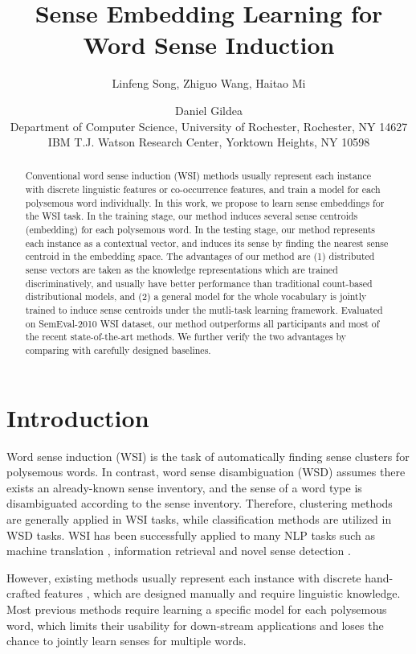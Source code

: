 \documentclass[11pt]{article}
\title{Sense Embedding Learning for Word Sense Induction}
\author{Linfeng Song, Zhiguo Wang, Haitao Mi \and Daniel Gildea \\
  Department of Computer Science, University of Rochester, Rochester, NY 14627 \\
  IBM T.J. Watson Research Center, Yorktown Heights, NY 10598  \\
  }
\date{}
\begin{document}
\maketitle

\begin{abstract}
Conventional word sense induction (WSI) methods usually represent each instance with discrete linguistic features or co-occurrence features, and train a model for each polysemous word individually. 
In this work, we propose to learn sense embeddings for the WSI task. 
In the training stage, our method induces several sense centroids (embedding) for each polysemous word. 
In the testing stage, our method represents each instance as a contextual vector, and induces its sense by finding the nearest sense centroid in the embedding space. 
The advantages of our method are 
(1) distributed sense vectors are taken as the knowledge representations which are trained discriminatively, and usually have better performance than traditional count-based distributional models,
and (2) a general model for the whole vocabulary is jointly trained to induce sense centroids under the mutli-task learning framework. 
Evaluated on SemEval-2010 WSI dataset, our method outperforms all participants and most of the recent state-of-the-art methods.
We further verify the two advantages by comparing with carefully designed baselines.
\end{abstract}


\section{Introduction}

Word sense induction (WSI) is the task of automatically finding sense clusters for polysemous words. In contrast, 
word sense disambiguation (WSD) assumes there exists an already-known sense inventory, 
and the sense of a word type is disambiguated according to the sense inventory.
Therefore, clustering methods are generally applied in WSI tasks, while classification methods are utilized in WSD tasks.
WSI has been successfully applied to many NLP tasks such as machine translation \cite{xiong-zhang:2014:P14-1}, information retrieval \cite{navigli-crisafulli:2010:EMNLP} and novel sense detection \cite{lau-EtAl:2012:EACL2012}.

However, existing methods usually represent each instance with discrete hand-crafted features \cite{bordag2006word,chen-EtAl:2009:NAACLHLT091,vandecruys-apidianaki:2011:ACL-HLT2011,purandare-pedersen:2004:CONLL}, 
which are designed manually and require linguistic knowledge.
Most previous methods require learning a specific model for each polysemous word, which limits their usability for down-stream applications and loses the chance to jointly learn senses for multiple words.
\end{document}
